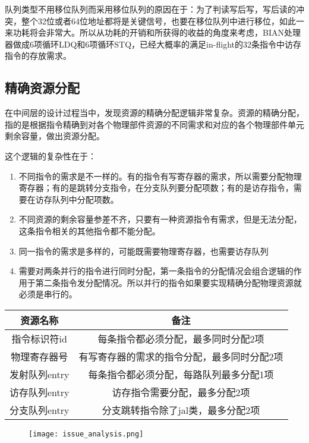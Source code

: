 队列类型不用移位队列而采用移位队列的原因在于：为了判读写后写，写后读的冲突，整个32位或者64位地址都将是关键信号，也要在移位队列中进行移位，如此一来功耗将会非常大。所以从功耗的开销和所获得的收益的角度来考虑，BIAN处理器做成6项循环LDQ和6项循环STQ，已经大概率的满足in-flight的32条指令中访存指令的存放需求。

\subsection{精确资源分配}
在中间层的设计过程当中，发现资源的精确分配逻辑非常复杂。资源的精确分配，指的是根据指令精确到对各个物理部件资源的不同需求和对应的各个物理部件单元剩余容量，做出资源分配。

这个逻辑的复杂性在于：
\begin{enumerate}[label=(\alph*)]
	\item 不同指令的需求是不一样的。有的指令有写寄存器的需求，所以需要分配物理寄存器；有的是跳转分支指令，在分支队列要分配项数；有的是访存指令，需要在访存队列中分配项数。
	\item 不同资源的剩余容量参差不齐，只要有一种资源指令有需求，但是无法分配，这条指令相关的其他指令都不能分配。
	\item 同一指令的需求是多样的，可能既需要物理寄存器，也需要访存队列
	\item 需要对两条并行的指令进行同时分配，第一条指令的分配情况会组合逻辑的作用于第二条指令发分配情况。所以并行的指令如果要实现精确分配物理资源就必须是串行的。
\end{enumerate}
\begin{table}[!htbp]
	\label{tab:resource}
	\centering
	\footnotesize%
	\setlength{\tabcolsep}{4pt}%
	\renewcommand{\arraystretch}{1.2}%
	\begin{tabular}{cc}
		\hline
		资源名称 & 备注 \\%
		\hline
		指令标识符id   & 每条指令都必须分配，最多同时分配2项  \\
		物理寄存器号   & 有写寄存器的需求的指令分配，最多同时分配2项  \\
		发射队列entry & 每条指令都必须分配，每路队列最多分配1项  \\
		访存队列entry & 访存指令需要分配，最多分配2项 \\
		分支队列entry & 分支跳转指令除了jal类，最多分配2项 \\
		\hline
	\end{tabular}
\end{table}
\begin{figure}[!htbp]
	\centering
	\texttt{[image: issue\_analysis.png]}
	\label{fig:issue_analysis}
\end{figure}

